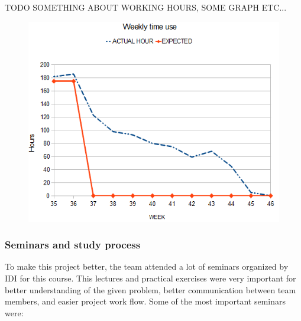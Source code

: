 	TODO SOMETHING ABOUT WORKING HOURS, SOME GRAPH ETC...

    \begin{figure}[htb]
        \centering
        \includegraphics[scale=0.88]{timebudget.png}
        \label{fig:time}
    \end{figure}
	
	\subsubsection{Seminars and study process}
	To make this project better,  the team attended a lot of seminars organized by IDI for this course. This lectures and practical exercises were very important for better understanding of the given problem, better communication between team members, and easier project work flow. Some of the most important seminars were:
	
